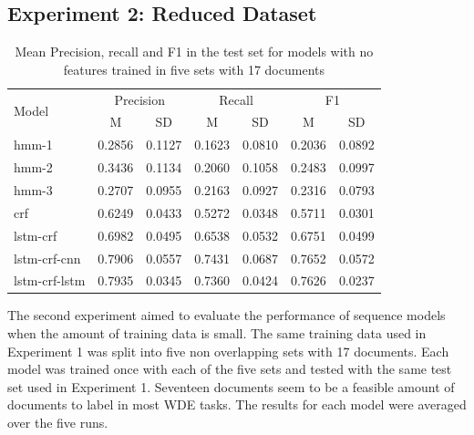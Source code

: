 \documentclass{nle}
\begin{document}
\subsection{Experiment 2: Reduced Dataset}

\begin{table}[h]
  \small
  \begin{center}
    \begin{tabular}{ lllllll }
      \toprule
      \multirow{2}{*}{Model} & \multicolumn{2}{c}{Precision} & \multicolumn{2}{c}{Recall} & \multicolumn{2}{c}{F1} \\
                             & \multicolumn{1}{c}{\tiny{M}} & \multicolumn{1}{c}{\tiny{SD}}
			     & \multicolumn{1}{c}{\tiny{M}} & \multicolumn{1}{c}{\tiny{SD}}
			     & \multicolumn{1}{c}{\tiny{M}} & \multicolumn{1}{c}{\tiny{SD}} \\
      \midrule
      hmm-1	      & 0.2856 & 0.1127 & 0.1623 & 0.0810 & 0.2036 & 0.0892 \\
      hmm-2	      & 0.3436 & 0.1134 & 0.2060 & 0.1058 & 0.2483 & 0.0997 \\
      hmm-3	      & 0.2707 & 0.0955 & 0.2163 & 0.0927 & 0.2316 & 0.0793 \\
      crf	      & 0.6249 & 0.0433 & 0.5272 & 0.0348 & 0.5711 & 0.0301 \\
      lstm-crf	      & 0.6982 & 0.0495 & 0.6538 & 0.0532 & 0.6751 & 0.0499 \\
      lstm-crf-cnn    & 0.7906 & 0.0557 & 0.7431 & 0.0687 & 0.7652 & 0.0572 \\
      lstm-crf-lstm   & 0.7935 & 0.0345 & 0.7360 & 0.0424 & 0.7626 & 0.0237 \\
      \bottomrule
    \end{tabular}
  \end{center}
  \caption{Mean Precision, recall and F1 in the test set for models with no features
   trained in five sets with 17 documents}
  \label{tab:experiment2}
\end{table}

The second experiment aimed to evaluate the performance of sequence models when 
the amount of training data is small. The same training data used in Experiment 1 was
split into five non overlapping sets with 17 documents. Each model was trained once 
with each of the five sets and tested with the same test set used in Experiment 1. 
Seventeen documents seem to be a feasible amount of documents to label in most WDE 
tasks. The results for each model were averaged over the five runs.
\end{document}
